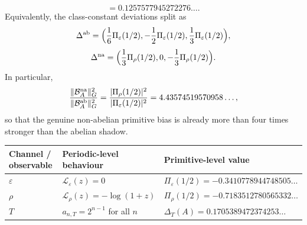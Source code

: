 \begin{corollary}
\begin{equation}
    =0.1257577945272276\ldots.
  \end{equation}
  Equivalently, the class-constant deviations split as
  \begin{equation}\label{eq:s3-example-abelian-shadow}
    \Delta^{\mathrm{ab}}
    =
    \Bigl(
      \frac16\Pi_\varepsilon(1/2),
      -\frac12\Pi_\varepsilon(1/2),
      \frac13\Pi_\varepsilon(1/2)
    \Bigr),
  \end{equation}
  \begin{equation}\label{eq:s3-example-nonabelian-defect}
    \Delta^{\mathrm{na}}
    =
    \Bigl(
      \frac13\Pi_\rho(1/2),
      0,
      -\frac13\Pi_\rho(1/2)
    \Bigr).
  \end{equation}
  In particular,
  \begin{equation}\label{eq:s3-example-energy-ratio}
    \frac{\lVert \mathcal B_A^{\mathrm{na}} \rVert_G^2}
         {\lVert \mathcal B_A^{\mathrm{ab}} \rVert_G^2}
    =
    \frac{\lvert \Pi_\rho(1/2) \rvert^2}
         {\lvert \Pi_\varepsilon(1/2) \rvert^2}
    =4.43574519570958\ldots,
  \end{equation}
  so that the genuine non-abelian primitive bias is already more than
  four times stronger than the abelian shadow.
\end{corollary}

\begin{center}
\footnotesize
\begin{tabular}{@{}p{}p{}p{}@{}}
\toprule
Channel / observable & Periodic-level behaviour & Primitive-level value \\
\midrule
\(\varepsilon\) &
\(\mathcal L_\varepsilon(z)=0\) &
\(\Pi_\varepsilon(1/2)=-0.3410778944748505\ldots\) \\
\(\rho\) &
\(\mathcal L_\rho(z)=-\log(1+z)\) &
\(\Pi_\rho(1/2)=-0.7183512780565332\ldots\) \\
\(T\) &
\(a_{n,T}=2^{n-1}\) for all \(n\) &
\(\Delta_T(A)=0.1705389472374253\ldots\) \\
\bottomrule
\end{tabular}
\end{center}

